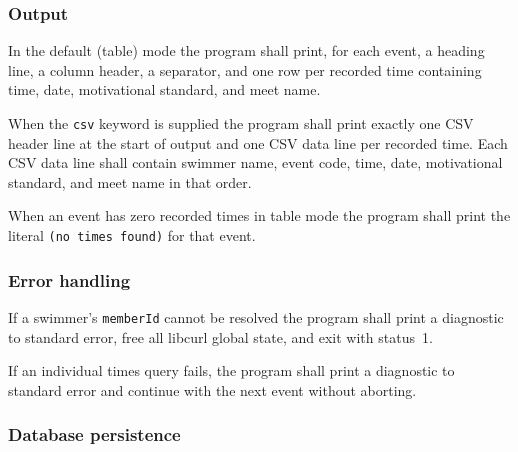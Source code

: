 \documentclass[12pt]{article}
\newcommand{\code}[1]{\texttt{#1}}
\newcommand{\req}[1]{\textbf{[#1]}}
\begin{document}
\subsubsection{Output}

\begin{description}[style=nextline]
  \item[\req{REQ-F-50}] In the default (table) mode the program
        shall print, for each event, a heading line, a column
        header, a separator, and one row per recorded time
        containing time, date, motivational standard, and meet name.
  \item[\req{REQ-F-51}] When the \code{csv} keyword is supplied
        the program shall print exactly one CSV header line at the
        start of output and one CSV data line per recorded time.
        Each CSV data line shall contain swimmer name, event code,
        time, date, motivational standard, and meet name in that order.
  \item[\req{REQ-F-52}] When an event has zero recorded times in
        table mode the program shall print the literal
        \code{(no times found)} for that event.
\end{description}

\subsubsection{Error handling}

\begin{description}[style=nextline]
  \item[\req{REQ-F-60}] If a swimmer's \code{memberId} cannot be
        resolved the program shall print a diagnostic to standard
        error, free all libcurl global state, and exit with
        status~1.
  \item[\req{REQ-F-61}] If an individual times query fails, the
        program shall print a diagnostic to standard error and
        continue with the next event without aborting.
\end{description}

\subsubsection{Database persistence}
\end{document}
